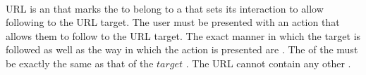  \\

URL is an  that marks the  to belong to a  that sets its interaction to allow following to the URL target. The user must be presented with an action that allows them to follow to the URL target. The exact manner in which the target is followed as well as the way in which the action is presented are . The  of the  must be exactly the same as that of the \inline$target$ . The URL  cannot contain any other .\\

\begin{examples}
\end{examples}

